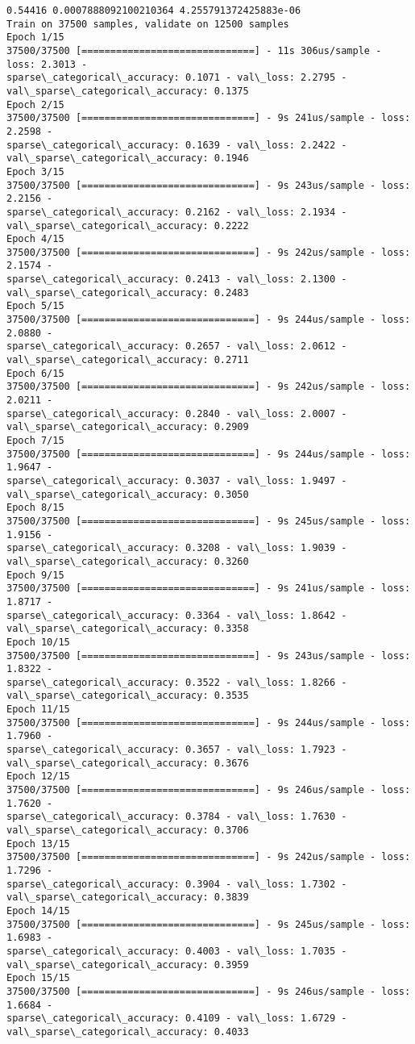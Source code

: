 \documentclass[11pt]{article}
\begin{document}
    \begin{Verbatim}[commandchars=\\\{\}]
0.54416 0.0007888092100210364 4.255791372425883e-06
Train on 37500 samples, validate on 12500 samples
Epoch 1/15
37500/37500 [==============================] - 11s 306us/sample - loss: 2.3013 -
sparse\_categorical\_accuracy: 0.1071 - val\_loss: 2.2795 -
val\_sparse\_categorical\_accuracy: 0.1375
Epoch 2/15
37500/37500 [==============================] - 9s 241us/sample - loss: 2.2598 -
sparse\_categorical\_accuracy: 0.1639 - val\_loss: 2.2422 -
val\_sparse\_categorical\_accuracy: 0.1946
Epoch 3/15
37500/37500 [==============================] - 9s 243us/sample - loss: 2.2156 -
sparse\_categorical\_accuracy: 0.2162 - val\_loss: 2.1934 -
val\_sparse\_categorical\_accuracy: 0.2222
Epoch 4/15
37500/37500 [==============================] - 9s 242us/sample - loss: 2.1574 -
sparse\_categorical\_accuracy: 0.2413 - val\_loss: 2.1300 -
val\_sparse\_categorical\_accuracy: 0.2483
Epoch 5/15
37500/37500 [==============================] - 9s 244us/sample - loss: 2.0880 -
sparse\_categorical\_accuracy: 0.2657 - val\_loss: 2.0612 -
val\_sparse\_categorical\_accuracy: 0.2711
Epoch 6/15
37500/37500 [==============================] - 9s 242us/sample - loss: 2.0211 -
sparse\_categorical\_accuracy: 0.2840 - val\_loss: 2.0007 -
val\_sparse\_categorical\_accuracy: 0.2909
Epoch 7/15
37500/37500 [==============================] - 9s 244us/sample - loss: 1.9647 -
sparse\_categorical\_accuracy: 0.3037 - val\_loss: 1.9497 -
val\_sparse\_categorical\_accuracy: 0.3050
Epoch 8/15
37500/37500 [==============================] - 9s 245us/sample - loss: 1.9156 -
sparse\_categorical\_accuracy: 0.3208 - val\_loss: 1.9039 -
val\_sparse\_categorical\_accuracy: 0.3260
Epoch 9/15
37500/37500 [==============================] - 9s 241us/sample - loss: 1.8717 -
sparse\_categorical\_accuracy: 0.3364 - val\_loss: 1.8642 -
val\_sparse\_categorical\_accuracy: 0.3358
Epoch 10/15
37500/37500 [==============================] - 9s 243us/sample - loss: 1.8322 -
sparse\_categorical\_accuracy: 0.3522 - val\_loss: 1.8266 -
val\_sparse\_categorical\_accuracy: 0.3535
Epoch 11/15
37500/37500 [==============================] - 9s 244us/sample - loss: 1.7960 -
sparse\_categorical\_accuracy: 0.3657 - val\_loss: 1.7923 -
val\_sparse\_categorical\_accuracy: 0.3676
Epoch 12/15
37500/37500 [==============================] - 9s 246us/sample - loss: 1.7620 -
sparse\_categorical\_accuracy: 0.3784 - val\_loss: 1.7630 -
val\_sparse\_categorical\_accuracy: 0.3706
Epoch 13/15
37500/37500 [==============================] - 9s 242us/sample - loss: 1.7296 -
sparse\_categorical\_accuracy: 0.3904 - val\_loss: 1.7302 -
val\_sparse\_categorical\_accuracy: 0.3839
Epoch 14/15
37500/37500 [==============================] - 9s 245us/sample - loss: 1.6983 -
sparse\_categorical\_accuracy: 0.4003 - val\_loss: 1.7035 -
val\_sparse\_categorical\_accuracy: 0.3959
Epoch 15/15
37500/37500 [==============================] - 9s 246us/sample - loss: 1.6684 -
sparse\_categorical\_accuracy: 0.4109 - val\_loss: 1.6729 -
val\_sparse\_categorical\_accuracy: 0.4033
    \end{Verbatim}
\end{document}
